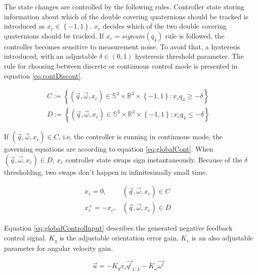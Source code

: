 The state changes are controlled by the following rules. Controller state storing information about which of the double covering quaternions should be tracked is introduced as $x_c \in  \left\lbrace -1,1 \right\rbrace $. $x_c$ decides which of the two double covering quaternions should be tracked. If $x_c = signum(q_4)$ rule is followed, the controller becomes sensitive to measurement noise. To avoid that, a hysteresis introduced, with an adjustable $\delta  \in (0,1)$ hysteresis threshold parameter. The rule for choosing between discrete or continuous control mode is presented in equation \ref{eq:contDiscont}.

\begin{align}
\label{eq:contDiscont}
C:= \left\lbrace (\vec{q},\vec{\omega},x_c) \in \mathbb{S}^3 \times \mathbb{R}^3 \times \left\lbrace -1,1 \right\rbrace : x_c q_4 \geq -\delta \right\rbrace  \\
\nonumber D:= \left\lbrace (\vec{q},\vec{\omega},x_c) \in \mathbb{S}^3 \times \mathbb{R}^3 \times \left\lbrace -1,1 \right\rbrace : x_cq_4 \leq -\delta \right\rbrace 
\end{align}

If $(\vec{q},\vec{\omega},x_c) \in C$, i.e. the controller is running in continuous mode, the governing equations are according to equation \ref{eq:globalCont}. When $(\vec{q},\vec{\omega},x_c) \in D$, $x_c$ controller state swaps sign instantaneously. Because of the $\delta$ thresholding, two swaps don't happen in infinitesimally small time.  

\begin{align}
	\label{eq:globalCont}
\dot{x}_c = 0, & (\vec{q},\vec{\omega},x_c)  \in C \\
\label{eq:globalDiscont}
x_c^+ = -x_c, & (\vec{q},\vec{\omega},x_c) \in D\
\end{align}

Equation \ref{eq:globalControlInput} describes the generated negative feedback control signal. $K_q$ is the adjustable orientation error gain, $K_e$ is an also adjustable parameter for angular velocity gain.

\begin{equation}
\label{eq:globalControlInput}
\vec{u} = -K_q x_c \vec{q^e}_{1:3} -K_\omega \vec{\omega^e}
\end{equation}


